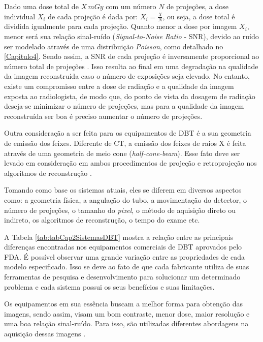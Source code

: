Dado uma dose total de $X\,mGy$ com um número $N$ de projeções, a dose individual $X_{i}$ de cada projeção é dada por: $X_{i} = \frac{X}{N}$, ou seja, a dose total é dividida igualmente para cada projeção. Quanto menor a dose por imagem $X_{i}$, menor será sua relação sinal-ruído (\textit{Signal-to-Noise Ratio} - \acs{SNR}), devido ao ruído ser modelado através de uma distribuição \textit{Poisson}, como detalhado no \autoref{Capitulo4}. Sendo assim, a \acs{SNR} de cada projeção é inversamente proporcional ao número total de projeções \cite{sechopoulos2009optimization}. Isso resulta ao final em uma degradação na qualidade da imagem reconstruída caso o número de exposições seja elevado.  No entanto, existe um compromisso entre a dose de radiação e a qualidade da imagem exposta ao radiologista, de modo que, do ponto de vista da dosagem de radiação deseja-se minimizar o número de projeções, mas para a qualidade da imagem reconstruída ser boa é preciso aumentar o número de projeções.

Outra consideração a ser feita para os equipamentos de \acs{DBT} é a sua geometria de emissão dos feixes. Diferente de \acs{CT}, a emissão dos feixes de raios X é feita através de uma geometria de meio cone (\textit{half-cone-beam}). Esse fato deve ser levado em consideração em ambos procedimentos de projeção e retroprojeção nos algoritmos de reconstrução \cite{wu2004comparison}. 
    
Tomando como base os sistemas atuais, eles se diferem em diversos aspectos como: a geometria física, a angulação do tubo, a movimentação do detector, o número de projeções, o tamanho do \textit{pixel}, o método de aquisição direto ou indireto, os algoritmos de reconstrução, o tempo do exame etc. 

A Tabela \ref{tab:tabCap2SistemasDBT} mostra a relação entre as principais diferenças encontradas nos equipamentos comerciais de \acs{DBT} aprovados pelo \acs{FDA}. É possível observar uma grande variação entre as propriedades de cada modelo especificado. Isso se deve ao fato de que cada fabricante utiliza de suas ferramentas de pesquisa e desenvolvimento para solucionar um determinado problema e cada sistema possui os seus benefícios e suas limitações. 

Os equipamentos em sua essência buscam a melhor forma para obtenção das imagens, sendo assim, visam um bom contraste, menor dose, maior resolução  e uma boa relação sinal-ruído. Para isso, são utilizadas diferentes abordagens na aquisição dessas imagens \cite{vedantham2015digital}. 

